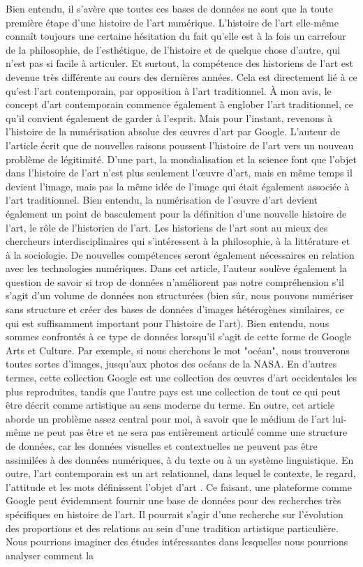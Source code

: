 \documentclass[a4paper, twoside, 12pt]{book}
\begin{document}
Bien entendu, il s'avère que toutes ces bases de données ne sont que la toute première étape d'une histoire de l'art numérique. L'histoire de l'art elle-même connaît toujours une certaine hésitation du fait qu'elle est à la fois un carrefour de la philosophie, de l'esthétique, de l'histoire et de quelque chose d'autre, qui n'est pas si facile à articuler. Et surtout, la compétence des historiens de l'art est devenue très différente au cours des dernières années. Cela est directement lié à ce qu'est l'art contemporain, par opposition à l'art traditionnel. À mon avis, le concept d'art contemporain commence également à englober l'art traditionnel, ce qu'il convient également de garder à l'esprit. Mais pour l'instant, revenons à l'histoire de la numérisation absolue des œuvres d'art par Google. L'auteur de l'article écrit que de nouvelles raisons poussent l'histoire de l'art vers un nouveau problème de légitimité. D'une part, la mondialisation et la science font que l'objet dans l'histoire de l'art n'est plus seulement l'œuvre d'art, mais en même temps il devient l'image, mais pas la même idée de l'image qui était également associée à l'art traditionnel. Bien entendu, la numérisation de l'œuvre d'art devient également un point de basculement pour la définition d'une nouvelle histoire de l'art, le rôle de l'historien de l'art. Les historiens de l'art sont au mieux des chercheurs interdisciplinaires qui s'intéressent à la philosophie, à la littérature et à la sociologie. De nouvelles compétences seront également nécessaires en relation avec les technologies numériques. Dans cet article, l'auteur soulève également la question de savoir si trop de données n'améliorent pas notre compréhension s'il s'agit d'un volume de données non structurées (bien sûr, nous pouvons numériser sans structure et créer des bases de données d'images hétérogènes similaires, ce qui est suffisamment important pour l'histoire de l'art). Bien entendu, nous sommes confrontés à ce type de données lorsqu'il s'agit de cette forme de Google Arts et Culture. Par exemple, si nous cherchons le mot "océan", nous trouverons toutes sortes d'images, jusqu'aux photos des océans de la NASA. En d'autres termes, cette collection Google est une collection des œuvres d'art occidentales les plus reproduites, tandis que l'autre pays est une collection de tout ce qui peut être décrit comme artistique au sens moderne du terme. En outre, cet article aborde un problème assez central pour moi, à savoir que le médium de l'art lui-même ne peut pas être et ne sera pas entièrement articulé comme une structure de données, car les données visuelles et contextuelles ne peuvent pas être assimilées à des données numériques, à du texte ou à un système linguistique. En outre, l'art contemporain est un art relationnel, dans lequel le contexte, le regard, l'attitude et les mots définissent l'objet d'art\cite{Bourriaud, N. (2023). Esthétique relationnelle. Sternberg Press.} . Ce faisant, une plateforme comme Google peut évidemment fournir une base de données pour des recherches très spécifiques en histoire de l'art. Il pourrait s'agir d'une recherche sur l'évolution des proportions et des relations au sein d'une tradition artistique particulière. Nous pourrions imaginer des études intéressantes dans lesquelles nous pourrions analyser comment la 
\end{document}
